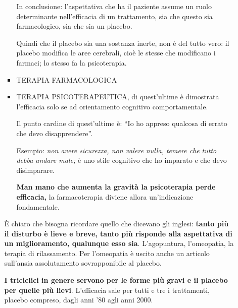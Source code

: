 \begin{itemize}
\begin{itemize}
\begin{itemize}
  In conclusione: l'aspettativa che ha il paziente assume un ruolo
  determinante nell'efficacia di un trattamento, sia che questo sia
  farmacologico, sia che sia un placebo.

  Quindi che il placebo sia una sostanza inerte, non è del tutto vero:
  il placebo modifica le aree cerebrali, cioè le stesse che modificano i
  farmaci; lo stesso fa la psicoterapia.

\item
  TERAPIA FARMACOLOGICA
  
\item
  TERAPIA PSICOTERAPEUTICA, di quest'ultime è dimostrata l'efficacia
  solo se ad orientamento cognitivo comportamentale.

  Il punto cardine di quest'ultime è: ``Io ho appreso qualcosa di errato
  che devo disapprendere''.

  Esempio: \emph{non avere sicurezza, non valere nulla, temere che tutto
  debba andare male;} è uno stile cognitivo che ho imparato e che devo
  disimparare.

  \textbf{Man mano che aumenta la gravità la psicoterapia perde
  efficacia,} la farmacoterapia diviene allora un'indicazione
  fondamentale.
\end{itemize}

È chiaro che bisogna ricordare quello che dicevano gli inglesi:
\textbf{tanto più il disturbo è lieve e breve, tanto più risponde alla
aspettativa di un miglioramento, qualunque esso sia}. L'agopuntura,
l'omeopatia, la terapia di rilassamento. Per l'omeopatia è uscito anche
un articolo sull'ansia assolutamento sovrapponibile al placebo.

\textbf{I triciclici in genere servono per le forme più gravi e il
placebo per quelle più lievi}. L'efficacia sale per tutti e tre i
trattamenti, placebo compreso, dagli anni '80 agli anni 2000.


\end{itemize}
\end{itemize}
